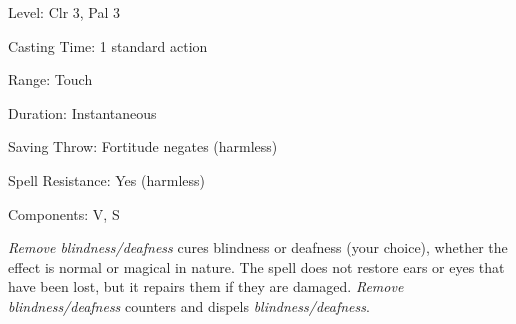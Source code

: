
\begin{description*}
\item[Level:] Clr 3, Pal 3
\item[Casting Time:] 1 standard action
\item[Range:] Touch
\item[Duration:] Instantaneous
\item[Saving Throw:] Fortitude negates (harmless)
\item[Spell Resistance:] Yes (harmless)
\item[Components:] V, S
\end{description*}

\textit{Remove blindness/deafness} cures blindness or deafness (your choice), whether
the effect is normal or magical in nature. The spell does not restore ears or eyes
that have been lost, but it repairs them if they are damaged.
\textit{Remove blindness/deafness} counters and dispels \textit{blindness/deafness}.
